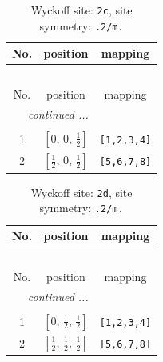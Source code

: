 \documentclass[fleqn,8pt]{jsarticle}
\begin{document}
\begin{longtable}{ccc}
\caption{Wyckoff site: {\tt 2c}, site symmetry: {\tt .2/m.}}
 \\
 \hline \hline
No. & position & mapping \\ \hline \endfirsthead

\multicolumn{2}{l}{\tablename\ \thetable{}} \\
 \hline \hline
No. & position & mapping \\ \hline \endhead

 \hline \hline
\multicolumn{2}{r}{\footnotesize\it continued ...} \\ \endfoot

 \hline \hline
\multicolumn{2}{r}{} \\ \endlastfoot

1 & $\left[ 0,\, 0,\, \frac{1}{2} \right]$ & {\tt [1,2,3,4]} \\ \hline
2 & $\left[ \frac{1}{2},\, 0,\, \frac{1}{2} \right]$ & {\tt [5,6,7,8]} \\
\end{longtable}
\renewcommand{\arraystretch}{1.2}
\begin{longtable}{ccc}
\caption{Wyckoff site: {\tt 2d}, site symmetry: {\tt .2/m.}}
 \\
 \hline \hline
No. & position & mapping \\ \hline \endfirsthead

\multicolumn{2}{l}{\tablename\ \thetable{}} \\
 \hline \hline
No. & position & mapping \\ \hline \endhead

 \hline \hline
\multicolumn{2}{r}{\footnotesize\it continued ...} \\ \endfoot

 \hline \hline
\multicolumn{2}{r}{} \\ \endlastfoot

1 & $\left[ 0,\, \frac{1}{2},\, \frac{1}{2} \right]$ & {\tt [1,2,3,4]} \\ \hline
2 & $\left[ \frac{1}{2},\, \frac{1}{2},\, \frac{1}{2} \right]$ & {\tt [5,6,7,8]} \\
\end{longtable}
\renewcommand{\arraystretch}{1.2}
\end{document}
